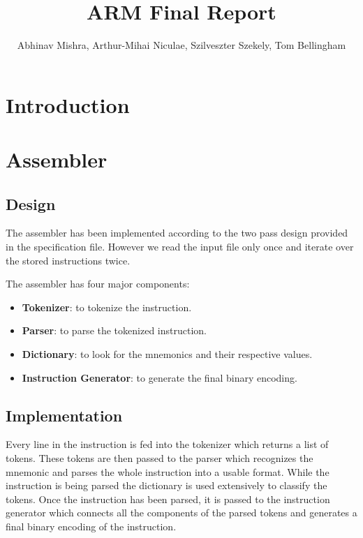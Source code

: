 \documentclass[11pt]{article}
\begin{document}
\title{ARM Final Report}
\author{
  Abhinav Mishra,
  Arthur-Mihai Niculae,
  Szilveszter Szekely,
  Tom Bellingham
}

\maketitle

\section{Introduction}

\section{Assembler}

\subsection{Design}

The assembler has been implemented according to the two pass design provided in
the specification file. However we read the input file only once and iterate
over the stored instructions twice.

The assembler has four major components:
\begin{itemize}[noitemsep,topsep=0pt]
  \item \textbf{Tokenizer}:
    to tokenize the instruction.
  \item \textbf{Parser}:
    to parse the tokenized instruction.
  \item \textbf{Dictionary}:
    to look for the mnemonics and their respective values.
  \item \textbf{Instruction Generator}:
    to generate the final binary encoding.
\end{itemize}

\subsection{Implementation}

Every line in the instruction is fed into the tokenizer which returns a list
of tokens. These tokens are then passed to the parser which recognizes the
mnemonic and parses the whole instruction into a usable format. While the
instruction is being parsed the dictionary is used extensively to classify the
tokens. Once the instruction has been parsed, it is passed to the instruction
generator which connects all the components of the parsed tokens and generates
a final binary encoding of the instruction.
\end{document}
